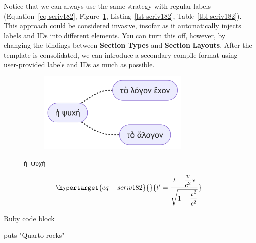\documentclass[
  12pt,
  a4paper,
  numbers=noenddot,
  titlepage,
  toclink=all,
  toc=bibliography]{scrbook}
\newenvironment{Shaded}{\begin{snugshade}}{\end{snugshade}}
\newcommand{\FunctionTok}[1]{\textcolor[rgb]{0.28,0.35,0.67}{#1}}
\newcommand{\StringTok}[1]{\textcolor[rgb]{0.13,0.47,0.30}{#1}}
\theoremstyle{plain}
\theoremstyle{definition}
\theoremstyle{definition}
\theoremstyle{definition}
\theoremstyle{plain}
\theoremstyle{plain}
\theoremstyle{plain}
\theoremstyle{plain}
\theoremstyle{remark}
\begin{document}
\protect\hypertarget{scriv182}{}{}

Notice that we can always use the same strategy with regular labels
(\protect\hypertarget{cite_53}{}{\label{cite_53}Equation~\ref{eq-scriv182}},
\protect\hypertarget{cite_54}{}{\label{cite_54}Figure~\ref{fig-scriv182}},
\protect\hypertarget{cite_55}{}{\label{cite_55}Listing~\ref{lst-scriv182}},
\protect\hypertarget{cite_56}{}{\label{cite_56}Table~\ref{tbl-scriv182}}).
This approach could be considered invasive, insofar as it automatically
injects labels and IDs into different elements. You can turn this off,
however, by changing the bindings between \textbf{Section Types} and
\textbf{Section Layouts}. After the template is consolidated, we can
introduce a secondary compile format using user-provided labels and IDs
as much as possible.

\begin{figure}

{\centering 

\begin{figure}[H]

{\centering \includegraphics[width=2.89in,height=1.52in]{export_files/figure-latex/mermaid-figure-2.png}

}

\end{figure}

}

\caption{\label{fig-scriv182}ἡ~ψυχή}

\end{figure}

\begin{equation}\protect\hypertarget{eq-scriv182}{}{t' = \frac{t - \dfrac{v}{c^{2}}x}{\sqrt{1 - \dfrac{v^{2}}{c^{2}}}}}\label{eq-scriv182}\end{equation}

\begin{codelisting}

\caption{Ruby code block}

\hypertarget{lst-scriv182}{%
\label{lst-scriv182}}%
\begin{Shaded}
\begin{Highlighting}[numbers=left,,]
\FunctionTok{puts} \StringTok{"Quarto rocks"}
\end{Highlighting}
\end{Shaded}

\end{codelisting}
\end{document}
